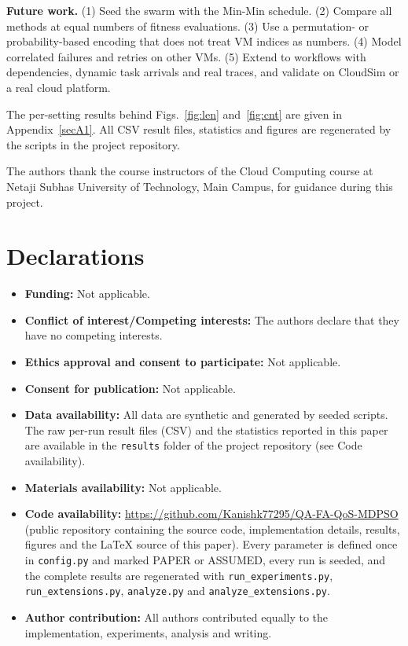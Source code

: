 \documentclass[pdflatex,sn-basic]{sn-jnl}
\theoremstyle{thmstyleone}%
\theoremstyle{thmstyletwo}%
\theoremstyle{thmstylethree}%
\begin{document}
\textbf{Future work.} (1) Seed the swarm with the Min-Min schedule. (2) Compare all methods at equal numbers of fitness evaluations. (3) Use a permutation- or probability-based encoding that does not treat VM indices as numbers. (4) Model correlated failures and retries on other VMs. (5) Extend to workflows with dependencies, dynamic task arrivals and real traces, and validate on CloudSim \citep{calheiros2011} or a real cloud platform.

\backmatter

The per-setting results behind Figs.~\ref{fig:len} and~\ref{fig:cnt} are given in Appendix~\ref{secA1}. All CSV result files, statistics and figures are regenerated by the scripts in the project repository.

The authors thank the course instructors of the Cloud Computing course at Netaji Subhas University of Technology, Main Campus, for guidance during this project.

\clearpage
\section*{Declarations}
\begin{itemize}
\item \textbf{Funding:} Not applicable.
\item \textbf{Conflict of interest/Competing interests:} The authors declare that they have no competing interests.
\item \textbf{Ethics approval and consent to participate:} Not applicable.
\item \textbf{Consent for publication:} Not applicable.
\item \textbf{Data availability:} All data are synthetic and generated by seeded scripts. The raw per-run result files (CSV) and the statistics reported in this paper are available in the \texttt{results} folder of the project repository (see Code availability).
\item \textbf{Materials availability:} Not applicable.
\item \textbf{Code availability:}\label{sec:avail} \url{https://github.com/Kanishk77295/QA-FA-QoS-MDPSO} (public repository containing the source code, implementation details, results, figures and the LaTeX source of this paper). Every parameter is defined once in \texttt{config.py} and marked PAPER or ASSUMED, every run is seeded, and the complete results are regenerated with \texttt{run\_experiments.py}, \texttt{run\_extensions.py}, \texttt{analyze.py} and \texttt{analyze\_extensions.py}.
\item \textbf{Author contribution:} All authors contributed equally to the implementation, experiments, analysis and writing.
\end{itemize}
\end{document}

